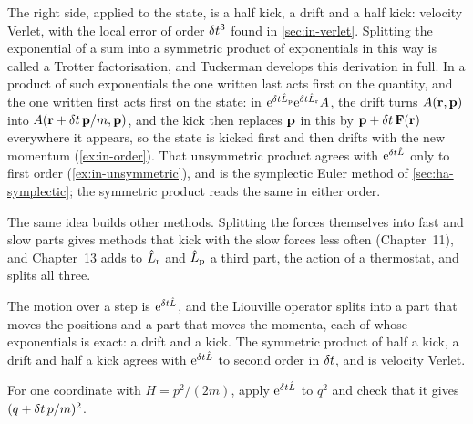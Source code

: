 The right side, applied to the state, is a half kick, a drift and a half
kick: velocity Verlet, with the local error of order $\delta t^3$ found in
\cref{sec:in-verlet}. Splitting the exponential of a sum into a symmetric
product of exponentials in this way is called a Trotter factorisation, and
Tuckerman develops this derivation in full\cite{Tuckerman2023}. In a product
of such exponentials the one written last acts first on the quantity, and
the one written first acts first on the state: in
$\mathrm{e}^{\delta t\hat{L}_{\mathrm p}}\mathrm{e}^{\delta t\hat{L}_{\mathrm r}}A$,
the drift turns $A(\bm{\mathrm{r}}, \bm{\mathrm{p}})$ into $A(\bm{\mathrm{r}} + \delta t\,\bm{\mathrm{p}}/m,
\bm{\mathrm{p}})$, and the kick then replaces $\bm{\mathrm{p}}$ in this by $\bm{\mathrm{p}} + \delta t\,
\bm{\mathrm{F}}(\bm{\mathrm{r}})$ everywhere it appears, so the state is kicked first and
then drifts with the new momentum (\cref{ex:in-order}). That unsymmetric
product agrees with $\mathrm{e}^{\delta t\hat{L}}$ only to first order
(\cref{ex:in-unsymmetric}), and is the symplectic Euler method of
\cref{sec:ha-symplectic}; the symmetric product reads the same in either
order.

The same idea builds other methods. Splitting the forces themselves into
fast and slow parts gives methods that kick with the slow forces less
often\cite{Tuckerman2023} (Chapter~11), and Chapter~13 adds to $\hat{L}_{\mathrm r}$ and $\hat{L}_{\mathrm p}$ a
third part, the action of a thermostat, and splits all three.

\begin{keyidea}
The motion over a step is $\mathrm{e}^{\delta t\hat{L}}$, and the Liouville
operator splits into a part that moves the positions and a part that moves
the momenta, each of whose exponentials is exact: a drift and a kick. The
symmetric product of half a kick, a drift and half a kick agrees with
$\mathrm{e}^{\delta t\hat{L}}$ to second order in $\delta t$, and is velocity Verlet.
\end{keyidea}


\begin{selfcheck}
For one coordinate with $H = p^2/(2m)$, apply $\mathrm{e}^{\delta t\hat{L}}$ to
$q^2$ and check that it gives $(q + \delta t\,p/m)^2$.
\end{selfcheck}
